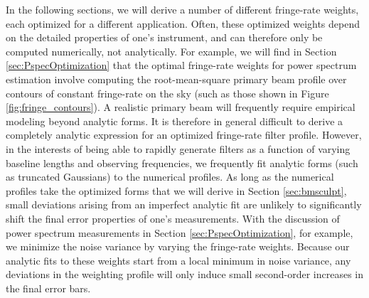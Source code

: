 \documentclass[twocolumn,apj,numberedappendix]{emulateapj}
\begin{document}
In the following sections, we will derive a number of different fringe-rate weights, each optimized for a different application. Often, these optimized weights depend on the detailed properties of one's instrument, and can therefore
only be computed numerically, not analytically. For example, we will find in Section \ref{sec:PspecOptimization} that the optimal fringe-rate weights for power spectrum estimation involve computing the root-mean-square primary beam
profile over contours of constant fringe-rate on the sky (such as those shown in Figure \ref{fig:fringe_contours}). A
realistic primary beam will frequently require empirical modeling beyond analytic forms. It is therefore in general difficult to derive a completely analytic expression for an optimized fringe-rate filter profile. However, in the interests of being able to rapidly generate filters as a function of varying baseline lengths and observing frequencies, we frequently fit analytic forms (such as truncated Gaussians) to the numerical profiles. As long as the numerical profiles take the optimized forms that we will derive in Section \ref{sec:bmsculpt}, small deviations arising from an imperfect analytic fit are unlikely to significantly shift the final error properties of one's measurements. With the discussion of power spectrum measurements in Section \ref{sec:PspecOptimization}, for example, we minimize the noise variance by varying the fringe-rate weights. Because our analytic fits to these weights start from a local minimum in noise variance, any deviations in the weighting profile will only induce small second-order increases in the final error bars.


%
%
\end{document}
